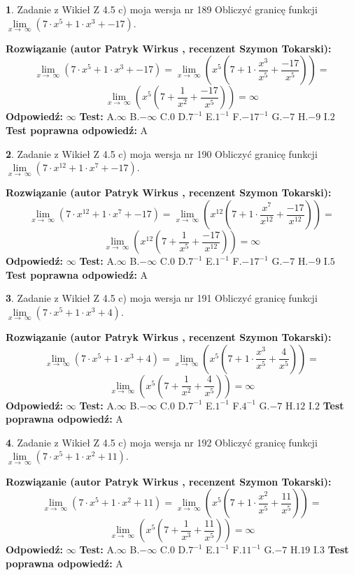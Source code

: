\documentclass[12pt, a4paper]{article}
\theoremstyle{definition} %
\newtheorem{zad}{}
\newcommand{\zadStart}[1]{\begin{zad}#1\newline}
\newcommand{\zadStop}{\end{zad}}
\newcommand{\rozwStart}[2]{\noindent \textbf{Rozwiązanie (autor #1 , recenzent #2): }\newline}
\newcommand{\rozwStop}{\newline}
\newcommand{\odpStart}{\noindent \textbf{Odpowiedź:}\newline}
\newcommand{\odpStop}{\newline}
\newcommand{\testStart}{\noindent \textbf{Test:}\newline}
\newcommand{\testStop}{\newline}
\newcommand{\kluczStart}{\noindent \textbf{Test poprawna odpowiedź:}\newline}
\newcommand{\kluczStop}{\newline}
\begin{document}
\zadStart{Zadanie z Wikieł Z 4.5 c) moja wersja nr 189}
Obliczyć granicę funkcji  $\lim\limits_{x\to\ \infty}(7 \cdot x^{5}+1 \cdot x^{3}+-17)$.
\zadStop
\rozwStart{Patryk Wirkus}{Szymon Tokarski}
$$\lim\limits_{x\to\ \infty}(7 \cdot x^{5}+1 \cdot x^{3}+-17) = \lim\limits_{x\to\ \infty}(x^{5}(7 +1 \cdot \frac{x^{3}}{x^{5}}+\frac{-17}{x^{5}})) =$$ $$\lim\limits_{x\to\ \infty}(x^{5}(7 +\frac{1}{x^{2}}+\frac{-17}{x^{5}})) =\infty$$
\rozwStop
\odpStart
$\infty$
\odpStop
\testStart
A.$\infty$ B.$-\infty$ C.$0$ D.$7^{-1}$ E.$1^{-1}$
F.$-17^{-1}$ G.$-7$
H.$-9$
I.$2$
\testStop
\kluczStart
A
\kluczStop



\zadStart{Zadanie z Wikieł Z 4.5 c) moja wersja nr 190}
Obliczyć granicę funkcji  $\lim\limits_{x\to\ \infty}(7 \cdot x^{12}+1 \cdot x^{7}+-17)$.
\zadStop
\rozwStart{Patryk Wirkus}{Szymon Tokarski}
$$\lim\limits_{x\to\ \infty}(7 \cdot x^{12}+1 \cdot x^{7}+-17) = \lim\limits_{x\to\ \infty}(x^{12}(7 +1 \cdot \frac{x^{7}}{x^{12}}+\frac{-17}{x^{12}})) =$$ $$\lim\limits_{x\to\ \infty}(x^{12}(7 +\frac{1}{x^{5}}+\frac{-17}{x^{12}})) =\infty$$
\rozwStop
\odpStart
$\infty$
\odpStop
\testStart
A.$\infty$ B.$-\infty$ C.$0$ D.$7^{-1}$ E.$1^{-1}$
F.$-17^{-1}$ G.$-7$
H.$-9$
I.$5$
\testStop
\kluczStart
A
\kluczStop



\zadStart{Zadanie z Wikieł Z 4.5 c) moja wersja nr 191}
Obliczyć granicę funkcji  $\lim\limits_{x\to\ \infty}(7 \cdot x^{5}+1 \cdot x^{3}+4)$.
\zadStop
\rozwStart{Patryk Wirkus}{Szymon Tokarski}
$$\lim\limits_{x\to\ \infty}(7 \cdot x^{5}+1 \cdot x^{3}+4) = \lim\limits_{x\to\ \infty}(x^{5}(7 +1 \cdot \frac{x^{3}}{x^{5}}+\frac{4}{x^{5}})) =$$ $$\lim\limits_{x\to\ \infty}(x^{5}(7 +\frac{1}{x^{2}}+\frac{4}{x^{5}})) =\infty$$
\rozwStop
\odpStart
$\infty$
\odpStop
\testStart
A.$\infty$ B.$-\infty$ C.$0$ D.$7^{-1}$ E.$1^{-1}$
F.$4^{-1}$ G.$-7$
H.$12$
I.$2$
\testStop
\kluczStart
A
\kluczStop



\zadStart{Zadanie z Wikieł Z 4.5 c) moja wersja nr 192}
Obliczyć granicę funkcji  $\lim\limits_{x\to\ \infty}(7 \cdot x^{5}+1 \cdot x^{2}+11)$.
\zadStop
\rozwStart{Patryk Wirkus}{Szymon Tokarski}
$$\lim\limits_{x\to\ \infty}(7 \cdot x^{5}+1 \cdot x^{2}+11) = \lim\limits_{x\to\ \infty}(x^{5}(7 +1 \cdot \frac{x^{2}}{x^{5}}+\frac{11}{x^{5}})) =$$ $$\lim\limits_{x\to\ \infty}(x^{5}(7 +\frac{1}{x^{3}}+\frac{11}{x^{5}})) =\infty$$
\rozwStop
\odpStart
$\infty$
\odpStop
\testStart
A.$\infty$ B.$-\infty$ C.$0$ D.$7^{-1}$ E.$1^{-1}$
F.$11^{-1}$ G.$-7$
H.$19$
I.$3$
\testStop
\kluczStart
A
\kluczStop
\end{document}
